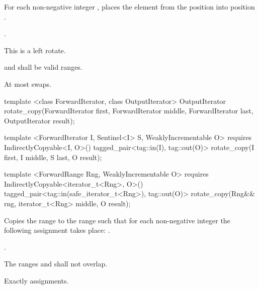 \begin{itemdescr}
\pnum
\effects
For each non-negative integer
,
places the element from the position
into position
.

\pnum
\returns {}.

\pnum
\notes
This is a left rotate.

\pnum
\requires
{}
and
shall be valid ranges.

\pnum
\complexity
At most
swaps.
\end{itemdescr}

%
\begin{removedblock}
\begin{itemdecl}
template <class ForwardIterator, class OutputIterator>
  OutputIterator
    rotate_copy(ForwardIterator first, ForwardIterator middle,
                ForwardIterator last, OutputIterator result);
\end{itemdecl}
\end{removedblock}
\begin{addedblock}
\begin{itemdecl}
template <ForwardIterator I, Sentinel<I> S, WeaklyIncrementable O>
  requires IndirectlyCopyable<I, O>()
  tagged_pair<tag::in(I), tag::out(O)>
    rotate_copy(I first, I middle, S last, O result);

template <ForwardRange Rng, WeaklyIncrementable O>
  requires IndirectlyCopyable<iterator_t<Rng>, O>()
  tagged_pair<tag::in(safe_iterator_t<Rng>), tag::out(O)>
    rotate_copy(Rng&& rng, iterator_t<Rng> middle, O result);
\end{itemdecl}
\end{addedblock}

\begin{itemdescr}
\pnum
\effects
Copies the range
to the range
such that for each non-negative integer
the following assignment takes place:
.

\pnum
\returns
{}.

\pnum
\requires
The ranges
and
shall not overlap.

\pnum
\complexity
Exactly
assignments.
\end{itemdescr}


